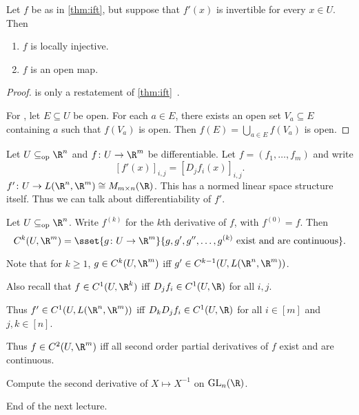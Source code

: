 \begin{corollary} \label{thm:ift:every}
    Let $f$ be as in \cref{thm:ift}, but suppose that $f'(x)$ is invertible
    for every $x \in U$.
    Then
    \begin{enumerate}
        \item $f$ is locally injective. \label{thm:ift:every:locally-11}
        \item $f$ is an open map. \label{thm:ift:every:open-map}
    \end{enumerate}
\end{corollary}
\begin{proof}
     is only a restatement of
    \cref{thm:ift}~.

    For , let $E \subseteq U$ be open.
    For each $a \in E$, there exists an open set $V_a \subseteq E$
    containing $a$ such that $f(V_a)$ is open.
    Then $f(E) = \bigcup_{a \in E} f(V_a)$ is open.
\end{proof}

Let $U \subopeneq \R^n$ and $f\colon U \to \R^m$ be differentiable.
Let $f = (f_1, \dots, f_m)$ and write \[
    {[f'(x)]}_{i,j} = {[D_j f_i(x)]}_{i,j}.
\] $f'\colon U \to L(\R^n, \R^m) \cong M_{m \times n}(\R)$.
This has a normed linear space structure itself.
Thus we can talk about differentiability of $f'$.
\begin{definition*}
    Let $U \subopeneq \R^n$.
    Write $f^{(k)}$ for the $k$th derivative of $f$, with $f^{(0)} = f$.
    Then \[
        C^k(U, \R^m) = \sset{g\colon U \to \R^m}{g, g', g'', \dots, g^{(k)}
        \text{ exist and are continuous}}.
    \]
\end{definition*}
Note that for $k \ge 1$, $g \in C^k(U, \R^m)$ iff
$g' \in C^{k-1}(U, L(\R^n, \R^m))$.

Also recall that $f \in C^1(U, \R^k)$ iff $D_j f_i \in C^1(U, \R)$ for all
$i, j$.

Thus $f' \in C^1(U, L(\R^n, \R^m))$ iff $D_k D_j f_i \in C^1(U, \R)$ for all
$i \in [m]$ and $j, k \in [n]$.

Thus $f \in C^2(U, \R^m)$ iff all second order partial derivatives of $f$
exist and are continuous.

\begin{exercise*}
    Compute the second derivative of $X \mapsto X^{-1}$ on $\GL_n(\R)$.
\end{exercise*}
\begin{solution}
    End of the next lecture.
\end{solution}
